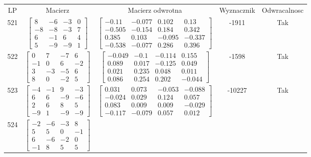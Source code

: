 \documentclass[a4paper,12pt]{article}
\begin{document}
\bgroup {} \vspace{0.2in} \begin{tabular}{c c c c c}
LP & Macierz & Macierz odwrotna & Wyznacznik & Odwracalnosc\\
521
&
$\begin{bmatrix} 8 & -6 & -3 & 0 \\ -8 & -8 & -3 & 7 \\ 6 & -1 & 6 & 4 \\ 5 & -9 & -9 & 1 \end{bmatrix}$
&
$\begin{bmatrix} -0.11 & -0.077 & 0.102 & 0.13 \\ -0.505 & -0.154 & 0.184 & 0.342 \\ 0.385 & 0.103 & -0.095 & -0.337 \\ -0.538 & -0.077 & 0.286 & 0.396 \end{bmatrix}$
&
-1911
&
Tak
\\
522
&
$\begin{bmatrix} 0 & 7 & -7 & 6 \\ -1 & 0 & 6 & -2 \\ 3 & -3 & -5 & 6 \\ 8 & 0 & -2 & 5 \end{bmatrix}$
&
$\begin{bmatrix} -0.049 & -0.1 & -0.114 & 0.155 \\ 0.089 & 0.017 & -0.125 & 0.049 \\ 0.021 & 0.235 & 0.048 & 0.011 \\ 0.086 & 0.254 & 0.202 & -0.044 \end{bmatrix}$
&
-1598
&
Tak
\\
523
&
$\begin{bmatrix} -4 & -1 & 9 & -3 \\ 6 & 6 & -9 & -6 \\ 2 & 6 & 8 & 5 \\ -9 & 1 & -9 & -9 \end{bmatrix}$
&
$\begin{bmatrix} 0.031 & 0.073 & -0.053 & -0.088 \\ -0.024 & 0.029 & 0.124 & 0.057 \\ 0.083 & 0.009 & 0.009 & -0.029 \\ -0.117 & -0.079 & 0.057 & 0.012 \end{bmatrix}$
&
-10227
&
Tak
\\
524
&
$\begin{bmatrix} -2 & -6 & -3 & 8 \\ 5 & 5 & 0 & -1 \\ 6 & -6 & -2 & 0 \\ -1 & 8 & 5 & 5 \end{bmatrix}$

\end{tabular}
\end{document}
